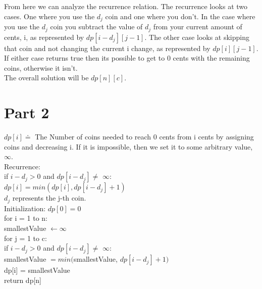 \documentclass[11pt,letter]{article}
\newcommand{\2}{\{0, 1\}}
\newcommand{\1}{\mathds{1}}
\theoremstyle{definition}
\begin{document}
From here we can analyze the recurrence relation. The recurrence looks at two cases. One where you use the $d_j$ coin and one where you don't. In the case where you use the $d_j$ coin you subtract the value of $d_j$ from your current amount of cents, i, as represented by $dp[i - d_j][j-1]$. The other case looks at skipping that coin and not changing the current i change, as represented by $dp[i][j-1]$.\\

If either case returns true then its possible to get to 0 cents with the remaining coins, otherwise it isn't.\\

The overall solution will be $dp[n][c]$. \\


\section*{Part 2}

$dp[i] \doteq $ The Number of coins needed to reach 0 cents from i cents by assigning coins and decreasing i. If it is impossible, then we set it to some arbitrary value, $\infty$.\\

Recurrence: \\
if $i - d_j > 0$ and $dp[i - d_j] \neq$ $\infty$:\\
\hspace*{3mm} $dp[i] = min(dp[i], dp[i - d_j] + 1)$\\
$d_j$ represents the j-th coin.\\


Initialization: $dp[0] = 0$ \\


for i = 1 to n: \\
\hspace*{3mm} smallestValue $\leftarrow \infty$ \\
\hspace*{3mm} for j = 1 to c: \\
\hspace*{6mm} if $i - d_j > 0$ and $dp[i - d_j] \neq$ $\infty$:\\
\hspace*{9mm} smallestValue $= min($smallestValue, $dp[i - d_j] + 1)$\\
\hspace*{3mm} dp[i] = smallestValue\\
return dp[n]\\
\end{document}
